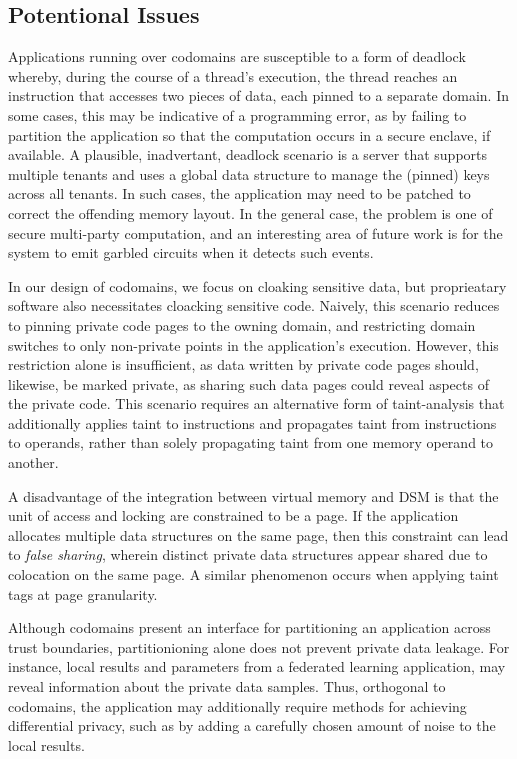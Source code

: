 \subsection{Potentional Issues}

%
Applications running over codomains are susceptible to a form of deadlock
whereby, during the course of a thread's execution, the thread reaches an
instruction that accesses two pieces of data, each pinned to a separate domain.
%
In some cases, this may be indicative of a programming error, as by failing to
partition the application so that the computation occurs in a secure enclave,
if available.
%
A plausible, inadvertant, deadlock scenario is a server that supports multiple
tenants and uses a global data structure to manage the (pinned) keys across all
tenants.
%
In such cases, the application may need to be patched to correct the offending
memory layout.
%
In the general case, the problem is one of secure multi-party computation, and
an interesting area of future work is for the system to emit garbled circuits
when it detects such events.


%
In our design of codomains, we focus on cloaking sensitive data, but
proprieatary software also necessitates cloacking sensitive code.
%
Naively, this scenario reduces to pinning private code pages to
the owning domain, and restricting domain switches to only
non-private points in the application's execution.
%
However, this restriction alone is insufficient, as data written by private
code pages should, likewise, be marked private, as sharing such data pages
could reveal aspects of the private code.
%
This scenario requires an alternative form of taint-analysis that additionally
applies taint to instructions and propagates taint from instructions to
operands, rather than solely propagating taint from one memory operand to
another.


%
A disadvantage of the integration between virtual memory and DSM is that the
unit of access and locking are constrained to be a page.
%
If the application allocates multiple data structures on the same page, then
this constraint can lead to \emph{false sharing}, wherein distinct private data
structures appear shared due to colocation on the same page.
%
A similar phenomenon occurs when applying taint tags at page granularity.


%
Although codomains present an interface for partitioning an application across
trust boundaries, partitionioning alone does not prevent private data leakage.
%
For instance, local results and parameters from a federated learning
application, may reveal information about the private data samples.
%
Thus, orthogonal to codomains, the application may additionally require
methods for achieving differential privacy, such as by adding a carefully
chosen amount of noise to the local results.


